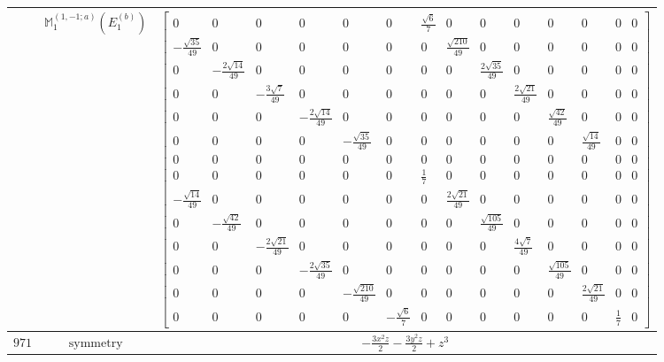 \documentclass[fleqn,8pt,landscape]{jsarticle}
\begin{document}
\begin{longtable}{ccc}
$  $ & $ \mathbb{M}_{1}^{(1,-1;a)}(E_{1}^{(b)}) $ & $ \begin{bmatrix} 0 & 0 & 0 & 0 & 0 & 0 & \frac{\sqrt{6}}{7} & 0 & 0 & 0 & 0 & 0 & 0 & 0 \\ - \frac{\sqrt{35}}{49} & 0 & 0 & 0 & 0 & 0 & 0 & \frac{\sqrt{210}}{49} & 0 & 0 & 0 & 0 & 0 & 0 \\ 0 & - \frac{2 \sqrt{14}}{49} & 0 & 0 & 0 & 0 & 0 & 0 & \frac{2 \sqrt{35}}{49} & 0 & 0 & 0 & 0 & 0 \\ 0 & 0 & - \frac{3 \sqrt{7}}{49} & 0 & 0 & 0 & 0 & 0 & 0 & \frac{2 \sqrt{21}}{49} & 0 & 0 & 0 & 0 \\ 0 & 0 & 0 & - \frac{2 \sqrt{14}}{49} & 0 & 0 & 0 & 0 & 0 & 0 & \frac{\sqrt{42}}{49} & 0 & 0 & 0 \\ 0 & 0 & 0 & 0 & - \frac{\sqrt{35}}{49} & 0 & 0 & 0 & 0 & 0 & 0 & \frac{\sqrt{14}}{49} & 0 & 0 \\ 0 & 0 & 0 & 0 & 0 & 0 & 0 & 0 & 0 & 0 & 0 & 0 & 0 & 0 \\ 0 & 0 & 0 & 0 & 0 & 0 & \frac{1}{7} & 0 & 0 & 0 & 0 & 0 & 0 & 0 \\ - \frac{\sqrt{14}}{49} & 0 & 0 & 0 & 0 & 0 & 0 & \frac{2 \sqrt{21}}{49} & 0 & 0 & 0 & 0 & 0 & 0 \\ 0 & - \frac{\sqrt{42}}{49} & 0 & 0 & 0 & 0 & 0 & 0 & \frac{\sqrt{105}}{49} & 0 & 0 & 0 & 0 & 0 \\ 0 & 0 & - \frac{2 \sqrt{21}}{49} & 0 & 0 & 0 & 0 & 0 & 0 & \frac{4 \sqrt{7}}{49} & 0 & 0 & 0 & 0 \\ 0 & 0 & 0 & - \frac{2 \sqrt{35}}{49} & 0 & 0 & 0 & 0 & 0 & 0 & \frac{\sqrt{105}}{49} & 0 & 0 & 0 \\ 0 & 0 & 0 & 0 & - \frac{\sqrt{210}}{49} & 0 & 0 & 0 & 0 & 0 & 0 & \frac{2 \sqrt{21}}{49} & 0 & 0 \\ 0 & 0 & 0 & 0 & 0 & - \frac{\sqrt{6}}{7} & 0 & 0 & 0 & 0 & 0 & 0 & \frac{1}{7} & 0 \end{bmatrix} $ \\ \hline
$ 971 $ & $ \text{symmetry} $ & $ - \frac{3 x^{2} z}{2} - \frac{3 y^{2} z}{2} + z^{3} $ \\

\end{longtable}
\end{document}
